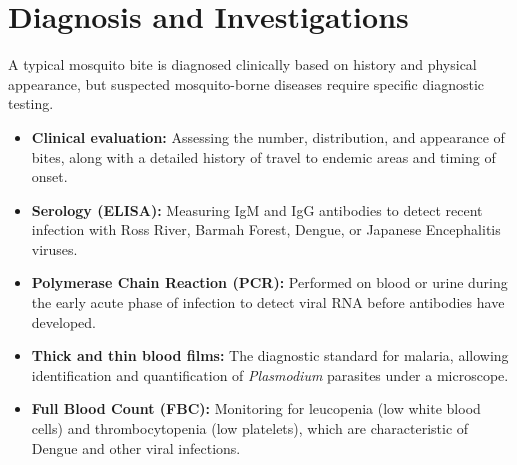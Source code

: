 \section*{Diagnosis and Investigations}
A typical mosquito bite is diagnosed clinically based on history and physical appearance, but suspected mosquito-borne diseases require specific diagnostic testing.
\begin{itemize}
    \item \textbf{Clinical evaluation:} Assessing the number, distribution, and appearance of bites, along with a detailed history of travel to endemic areas and timing of onset.
    \item \textbf{Serology (ELISA):} Measuring IgM and IgG antibodies to detect recent infection with Ross River, Barmah Forest, Dengue, or Japanese Encephalitis viruses.
    \item \textbf{Polymerase Chain Reaction (PCR):} Performed on blood or urine during the early acute phase of infection to detect viral RNA before antibodies have developed.
    \item \textbf{Thick and thin blood films:} The diagnostic standard for malaria, allowing identification and quantification of \textit{Plasmodium} parasites under a microscope.
    \item \textbf{Full Blood Count (FBC):} Monitoring for leucopenia (low white blood cells) and thrombocytopenia (low platelets), which are characteristic of Dengue and other viral infections.
\end{itemize}

